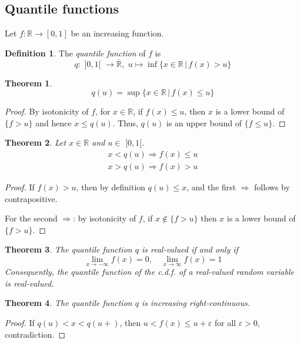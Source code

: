\documentclass[11pt, a4paper, openany]{book}
\newtheorem{thm}{Theorem}\newtheorem{lem}{Lemma}\newtheorem{crl}{Corollary}
\theoremstyle{definition}
\newtheorem{define}{Definition}\newtheorem{exam}{Example}\newtheorem{remark}{Remark}
\newcommand{\er}{\overline{\mathbb{R}}}
\begin{document}
\subsection{Quantile functions}
    Let $f:\mathbb{R}\rightarrow [0,1]$ be an increasing function.
    \begin{define}
        The \textit{quantile function} of $f$ is
        \[
            q:\,\,]0,1[\,\,\rightarrow \er,\,\,u\mapsto \inf{\{x\in\mathbb{R}\,|\,f(x)>u\}} 
        \]
    \end{define}
    \begin{thm}
        \[
            q(u)=\sup{\{x\in\mathbb{R}\,|\,f(x)\leqslant u\}}
        \]
    \end{thm}
    \begin{proof}
        By isotonicity of $f$, for $x\in\mathbb{R}$, if $f(x)\leqslant u$, then $x$ is a lower bound of $\{f>u\}$ and hence $x\leqslant q(u)$. Thus, $q(u)$ is an upper bound of $\{f\leqslant u\}$.
    \end{proof}
    \begin{thm}\label{lemma for quantile functions}
        Let $x\in\mathbb{R}$ and $u\in\,\,]0,1[$.
        \begin{gather*}
            x<q(u)\Longrightarrow f(x)\leqslant u\\
            x>q(u)\Longrightarrow f(x)>u
        \end{gather*}
    \end{thm}
    \begin{proof}
        If $f(x)>u$, then by definition $q(u)\leqslant x$, and the first $\Rightarrow$ follows by contrapositive.

        For the second $\Rightarrow$: by isotonicity of $f$, if $x\notin \{f>u\}$ then $x$ is a lower bound of $\{f>u\}$.
    \end{proof}
    \begin{thm}
        The quantile function $q$ is real-valued if and only if
        \[
            \lim_{x\to-\infty}f(x)=0,\quad\lim_{x\to\infty}f(x)=1
        \]
        Consequently, the quantile function of the c.d.f. of a real-valued random variable is real-valued.
    \end{thm}
    \begin{thm}\label{quantile function is increasing right-continous}
        The quantile function $q$ is increasing right-continuous.
    \end{thm}
    \begin{proof}
        If $q(u)<x<q(u+)$, then $u<f(x)\leqslant u+\varepsilon$ for all $\varepsilon>0$, contradiction.
    \end{proof}
\end{document}
